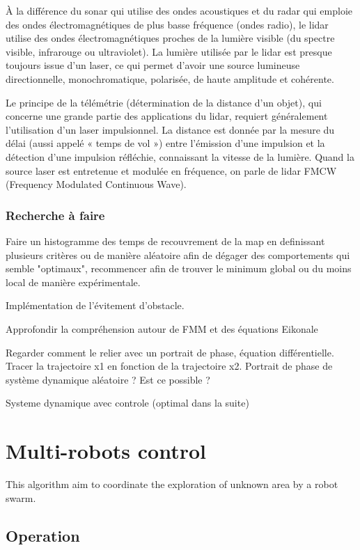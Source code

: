 \documentclass[main.tex]{subfiles}
\begin{document}
À la différence du sonar qui utilise des ondes acoustiques et du radar qui emploie des ondes électromagnétiques de plus basse fréquence (ondes radio), le lidar utilise des ondes électromagnétiques proches de la lumière visible (du spectre visible, infrarouge ou ultraviolet). La lumière utilisée par le lidar est presque toujours issue d'un laser, ce qui permet d'avoir une source lumineuse directionnelle, monochromatique, polarisée, de haute amplitude et cohérente.

Le principe de la télémétrie (détermination de la distance d'un objet), qui concerne une grande partie des applications du lidar, requiert généralement l'utilisation d'un laser impulsionnel. La distance est donnée par la mesure du délai (aussi appelé « temps de vol ») entre l'émission d'une impulsion et la détection d'une impulsion réfléchie, connaissant la vitesse de la lumière. Quand la source laser est entretenue et modulée en fréquence, on parle de lidar FMCW (Frequency Modulated Continuous Wave). 


\subsubsection{Recherche à faire}

Faire un histogramme des temps de recouvrement de la map en definissant plusieurs critères ou de manière aléatoire afin de dégager des comportements qui semble "optimaux", recommencer afin de trouver le minimum global ou du moins local de manière expérimentale.

Implémentation de l'évitement d'obstacle.

Approfondir la compréhension autour de FMM et des équations Eikonale

Regarder comment le relier avec un portrait de phase, équation différentielle.
Tracer la trajectoire x1 en fonction de la trajectoire x2.
Portrait de phase de système dynamique aléatoire ? Est ce possible ?

Systeme dynamique avec controle (optimal dans la suite)


\section{Multi-robots control}

This algorithm aim to coordinate the exploration of unknown area by a robot swarm.

\subsection{Operation}
\end{document}
